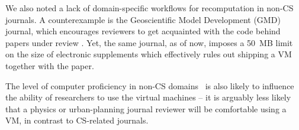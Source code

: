 We also noted a lack of domain-specific workflows for recomputation in non-CS journals.
A counterexample is the Geoscientific Model Development (GMD) journal, which encourages reviewers to get
  acquainted with the code behind papers under review \cite{GMD_editorial_2013}.
Yet, the same journal, as of now, imposes a 50~MB limit on the size of electronic supplements 
  which effectively rules out shipping a VM together with the paper.

The level of computer proficiency in non-CS domains~\cite{Merali_2010} is also likely to influence the ability of researchers to use the virtual machines -- it is arguably less likely that a physics or urban-planning journal reviewer will be comfortable using a VM, in contrast to CS-related journals.
